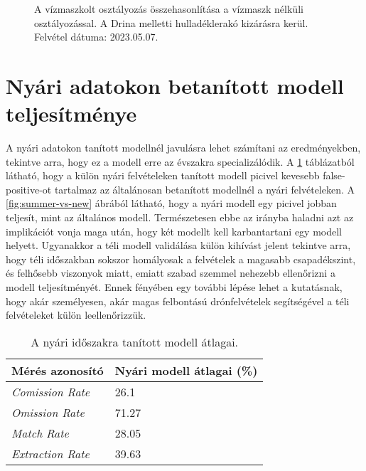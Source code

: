 \begin{figure}[H]
	\centering
	\hspace{5pt}
	\hspace{5pt}
	\caption{A vízmaszkolt osztályozás összehasonlítása a vízmaszk nélküli osztályozással. A Drina melletti hulladéklerakó kizárásra kerül. Felvétel dátuma: 2023.05.07.}
	\label{fig:river-mask-performance}
\end{figure}

\section{Nyári adatokon betanított modell teljesítménye}
\label{ch:summer-winter-models}

A nyári adatokon tanított modellnél javulásra lehet számítani az eredményekben, tekintve arra, hogy ez a modell erre az évszakra specializálódik. A \ref{tab:summer-winter-split} táblázatból látható, hogy a külön nyári felvételeken tanított modell picivel kevesebb false-positive-ot tartalmaz az általánosan betanított modellnél a nyári felvételeken. A \ref{fig:summer-vs-new} ábrából látható, hogy a nyári modell egy picivel jobban teljesít, mint az általános modell. Természetesen ebbe az irányba haladni azt az implikációt vonja maga után, hogy két modellt kell karbantartani egy modell helyett. Ugyanakkor a téli modell validálása külön kihívást jelent tekintve arra, hogy téli időszakban sokszor homályosak a felvételek a magasabb csapadékszint, és felhősebb viszonyok miatt, emiatt szabad szemmel nehezebb ellenőrizni a modell teljesítményét. Ennek fényében egy további lépése lehet a kutatásnak, hogy akár személyesen, akár magas felbontású drónfelvételek segítségével a téli felvételeket külön leellenőrizzük. 

\begin{table}[H]
	\centering
	\begin{tabular}{ | p{} | p{} | }
		\hline
		\textbf{Mérés azonosító} & \textbf{Nyári modell átlagai (\%)} \\
		\hline \hline
		\emph{Comission Rate} & 26.1 \\
		\hline
		\emph{Omission Rate} & 71.27  \\
		\hline
		\emph{Match Rate} & 28.05  \\
		\hline
        \emph{Extraction Rate} & 39.63 \\
		\hline
	\end{tabular}
	\caption{A nyári időszakra tanított modell átlagai.}
	\label{tab:summer-winter-split}
\end{table}

